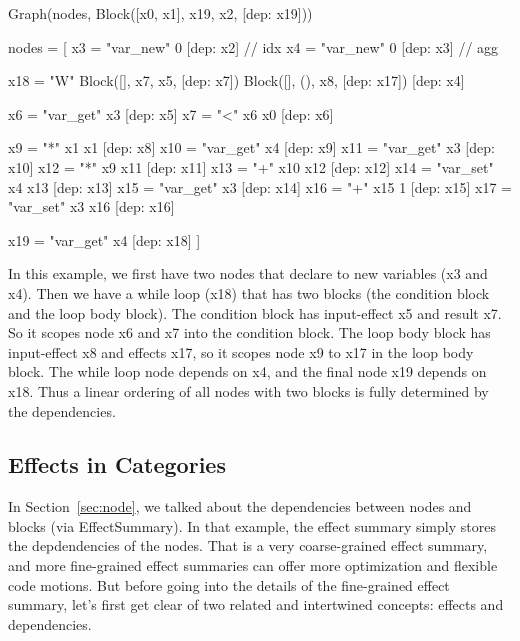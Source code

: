 \begin{listing}[scala]
Graph(nodes, Block([x0, x1], x19, x2, [dep: x19]))

nodes = [
  x3 = "var_new" 0    [dep: x2]   // idx
  x4 = "var_new" 0    [dep: x3]   // agg

  x18 = "W" Block([], x7, x5, [dep: x7])
            Block([], (), x8, [dep: x17]) [dep: x4]

    x6 = "var_get" x3       [dep: x5]
    x7 = "<" x6 x0          [dep: x6]

    x9 = "*" x1 x1          [dep: x8]
    x10 = "var_get" x4      [dep: x9]
    x11 = "var_get" x3      [dep: x10]
    x12 = "*" x9 x11        [dep: x11]
    x13 = "+" x10 x12       [dep: x12]
    x14 = "var_set" x4 x13  [dep: x13]
    x15 = "var_get" x3      [dep: x14]
    x16 = "+" x15 1         [dep: x15]
    x17 = "var_set" x3 x16  [dep: x16]

  x19 = "var_get" x4  [dep: x18]
]
\end{listing}

In this example, we first have two nodes that declare to new variables (x3 and x4).
Then we have a while loop (x18) that has two blocks (the condition block and the
loop body block). The condition block has input-effect x5 and result x7. So it scopes
node x6 and x7 into the condition block. The loop body block has input-effect x8
and effects x17, so it scopes node x9 to x17 in the loop body block.
The while loop node depends on x4, and the final node x19 depends on x18.
Thus a linear ordering of all nodes with two blocks is fully determined by the
dependencies.


\subsection{Effects in Categories}

In Section~\ref{sec:node}, we talked about the dependencies between nodes and blocks
(via EffectSummary). In that example, the effect summary simply stores the depdendencies of the nodes.
That is a very coarse-grained effect summary, and more fine-grained effect summaries can offer
more optimization and flexible code motions. But before going into the details of the fine-grained
effect summary, let's first get clear of two related and intertwined concepts: effects and dependencies.

